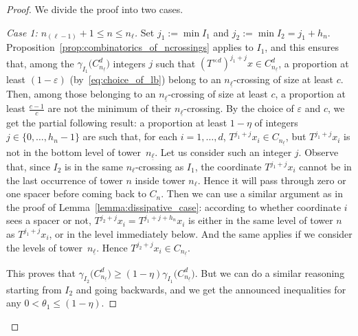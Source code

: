 \documentclass[10pt]{amsart}
\theoremstyle{definition}\newtheorem{defi}[theo]{Definition}\newtheorem{rema}[theo]{Remark}\newtheorem{exam}[theo]{Example}\newtheorem{exem}[theo]{Example}\newtheorem{nota}[theo]{Notation}
\newcommand{\egdef}{:=}
\newcommand{\cd}{C^{d}}
\newcommand{\td}{T^{\times d}}
\newcommand{\lb}{\underline{\ell}}
\newcommand{\Gam}[1]{\gamma_{#1}\bigl(\cd_{n_{\lb}}\bigr)}
\newenvironment{step}[1]{\begin{proof}[#1]}{\let\qed\relax \end{proof}}
\begin{document}
\goodbreak
\begin{proof}
We divide the proof into two cases.

\begin{step}{Case 1: $n_{(\ell-1)}+1\le n\le n_\ell$}
Set $j_1\egdef \min I_1$ and $j_2\egdef\min I_2=j_1+h_n$. Proposition~\ref{prop:combinatorics_of_ncrossings} applies to $I_1$, and this ensures that, among the $\Gam{I_1}$ integers $j$ such that $(\td)^{j_1+j}x\in \cd_{n_{\lb}}$, a proportion at least $(1-\varepsilon)$ (by~\eqref{eq:choice_of_lb}) belong to an $n_{\lb}$-crossing of size at least $c$. Then, among those belonging to an $n_{\lb}$-crossing of size at least $c$, a proportion at least $\frac{c-1}{c}$ are not the minimum of their $n_{\lb}$-crossing. By the choice of $\varepsilon$ and $c$, we get the partial following result: a proportion at least $1-\eta$ of integers $j\in\{0,\ldots,h_n-1\}$ are such that, for each $i=1,\ldots,d$, $T^{j_1+j}x_i\in C_{n_{\lb}}$, but $T^{j_1+j}x_i$ is not in the bottom level of tower~$n_{\lb}$. Let us consider such an integer $j$. Observe that, since $I_2$ is in the same $n_\ell$-crossing as $I_1$, the coordinate $T^{j_1+j}x_i$ cannot be in the last occurrence of tower $n$ inside tower $n_{\ell}$. Hence it will pass through zero or one spacer before coming back to $C_{n}$. Then we can use a similar argument as in the proof of Lemma~\ref{lemma:dissipative_case}: according to whether coordinate $i$ sees a spacer or not, $T^{j_2+j}x_i=T^{j_1+j+h_n}x_i$ is either in the same level of tower $n$ as $T^{j_1+j}x_i$, or in the level immediately below. And the same applies if we consider the levels of tower~$n_{\lb}$. Hence $T^{j_2+j}x_i\in C_{n_{\lb}}$.

This proves that $\Gam{I_2}\ge (1-\eta) \Gam{I_1}$. But we can do a similar reasoning starting from $I_2$ and going backwards, and we get the announced inequalities for any $0<\theta_1\le (1-\eta)$.
\end{step}


\end{proof}
\end{document}
